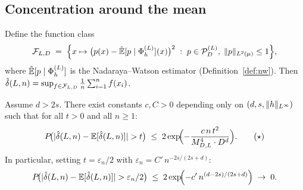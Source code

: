 \subsection{Concentration around the mean}
\label{subsec:mcdiarmiid}

Define the function class
\[
  \mathcal{F}_{L,D}
  \;=\;
  \Bigl\{x \mapsto \bigl(p(x) - \hat{\mathbb{E}}[p \mid \Phi_h^{(L)}](x)\bigr)^2
    \;:\; p \in \mathcal{P}_D^{(L)},\; \|p\|_{L^{2}(\mu)} \leq 1\Bigr\},
\]
where $\hat{\mathbb{E}}[p \mid \Phi_h^{(L)}]$ is the Nadaraya--Watson estimator
(Definition~\ref{def:nw}).
Then $\hat{\delta}(L,n) = \sup_{f \in \mathcal{F}_{L,D}} \frac{1}{n}\sum_{i=1}^n f(x_i)$.

\begin{proposition}
\label{prop:concentration}
Assume $d > 2s$.
There exist constants $c, C > 0$ depending only on $(d, s, \|h\|_{L^{\infty}})$
such that for all $t > 0$ and all $n \geq 1$:
\[
  P\!\bigl(|\hat{\delta}(L,n) - \mathbb{E}[\hat{\delta}(L,n)]| > t\bigr)
  \;\leq\;
  2\exp\!\Bigl(-\frac{c\,n\,t^2}{M_{D,L}^4 \cdot D^d}\Bigr).
  \tag{$\star$}
\]
In particular, setting $t = \varepsilon_n/2$ with
$\varepsilon_n = C'\,n^{-2s/(2s+d)}$:
\[
  P\!\bigl(|\hat{\delta}(L,n) - \mathbb{E}[\hat{\delta}(L,n)]| > \varepsilon_n/2\bigr)
  \;\leq\;
  2\exp\!\Bigl(-c'\,n^{(d-2s)/(2s+d)}\Bigr)
  \;\to\; 0.
\]
\end{proposition}

